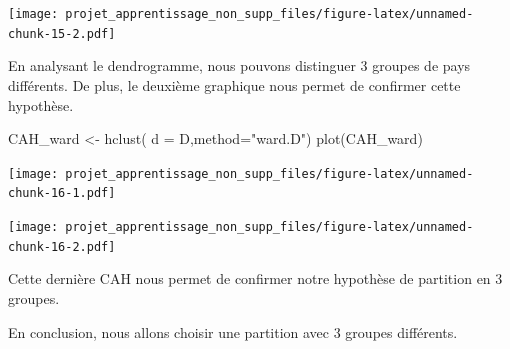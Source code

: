 \documentclass[
]{article}
\newenvironment{Shaded}{\begin{snugshade}}{\end{snugshade}}
\newcommand{\AttributeTok}[1]{\textcolor[rgb]{0.77,0.63,0.00}{#1}}
\newcommand{\FunctionTok}[1]{\textcolor[rgb]{0.00,0.00,0.00}{#1}}
\newcommand{\NormalTok}[1]{#1}
\newcommand{\OtherTok}[1]{\textcolor[rgb]{0.56,0.35,0.01}{#1}}
\newcommand{\SpecialCharTok}[1]{\textcolor[rgb]{0.00,0.00,0.00}{#1}}
\newcommand{\StringTok}[1]{\textcolor[rgb]{0.31,0.60,0.02}{#1}}
\begin{document}
\begin{Shaded}
\end{Shaded}

\texttt{[image: projet\_apprentissage\_non\_supp\_files/figure-latex/unnamed-chunk-15-2.pdf]}

En analysant le dendrogramme, nous pouvons distinguer 3 groupes de pays
différents. De plus, le deuxième graphique nous permet de confirmer
cette hypothèse.

\begin{Shaded}
\begin{Highlighting}[]
\NormalTok{CAH\_ward }\OtherTok{\textless{}{-}} \FunctionTok{hclust}\NormalTok{( }\AttributeTok{d =}\NormalTok{ D,}\AttributeTok{method=}\StringTok{"ward.D"}\NormalTok{)}
\FunctionTok{plot}\NormalTok{(CAH\_ward)}
\end{Highlighting}
\end{Shaded}

\texttt{[image: projet\_apprentissage\_non\_supp\_files/figure-latex/unnamed-chunk-16-1.pdf]}

\begin{Shaded}
\end{Shaded}

\texttt{[image: projet\_apprentissage\_non\_supp\_files/figure-latex/unnamed-chunk-16-2.pdf]}

Cette dernière CAH nous permet de confirmer notre hypothèse de partition
en 3 groupes.

En conclusion, nous allons choisir une partition avec 3 groupes
différents.
\end{document}

